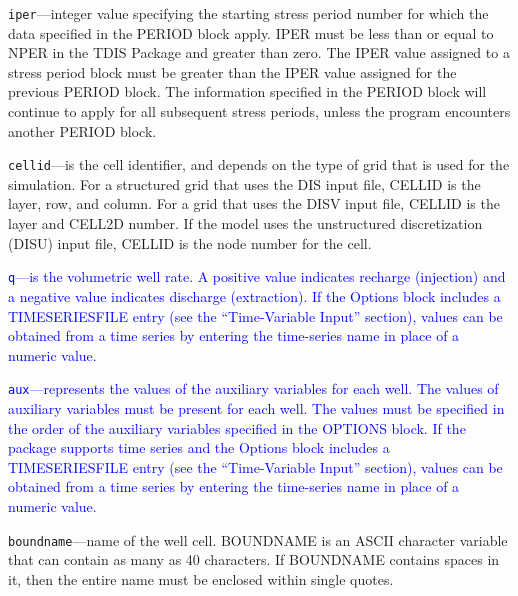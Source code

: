 \begin{description}
\item \texttt{iper}---integer value specifying the starting stress period number for which the data specified in the PERIOD block apply.  IPER must be less than or equal to NPER in the TDIS Package and greater than zero.  The IPER value assigned to a stress period block must be greater than the IPER value assigned for the previous PERIOD block.  The information specified in the PERIOD block will continue to apply for all subsequent stress periods, unless the program encounters another PERIOD block.

\item \texttt{cellid}---is the cell identifier, and depends on the type of grid that is used for the simulation.  For a structured grid that uses the DIS input file, CELLID is the layer, row, and column.   For a grid that uses the DISV input file, CELLID is the layer and CELL2D number.  If the model uses the unstructured discretization (DISU) input file, CELLID is the node number for the cell.

\item \textcolor{blue}{\texttt{q}---is the volumetric well rate. A positive value indicates recharge (injection) and a negative value indicates discharge (extraction). If the Options block includes a TIMESERIESFILE entry (see the ``Time-Variable Input'' section), values can be obtained from a time series by entering the time-series name in place of a numeric value.}

\item \textcolor{blue}{\texttt{aux}---represents the values of the auxiliary variables for each well. The values of auxiliary variables must be present for each well. The values must be specified in the order of the auxiliary variables specified in the OPTIONS block.  If the package supports time series and the Options block includes a TIMESERIESFILE entry (see the ``Time-Variable Input'' section), values can be obtained from a time series by entering the time-series name in place of a numeric value.}

\item \texttt{boundname}---name of the well cell.  BOUNDNAME is an ASCII character variable that can contain as many as 40 characters.  If BOUNDNAME contains spaces in it, then the entire name must be enclosed within single quotes.

\end{description}

